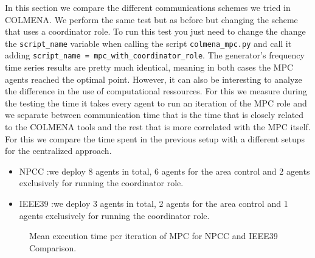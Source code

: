 \documentclass{article}
\begin{document}
In this section we compare the different communications schemes we tried in COLMENA. We perform the same test but as before but changing the scheme that uses a coordinator role. To run this test you just need to change the change the \texttt{script\_name} variable when calling the script \texttt{colmena\_mpc.py} and call it adding \texttt{script\_name = mpc\_with\_coordinator\_role}. The generator's frequency time series results are pretty much identical, meaning in both cases the MPC agents reached the optimal point. However, it can also be interesting to analyze the difference in the use of computational ressources. For this we measure during the testing the time it takes every agent to run an iteration of the MPC role and we separate between communication time that is the time that is closely related to the COLMENA tools and the rest that is more correlated with the MPC itself. For this we compare the time spent in the previous setup with a different setups for the centralized approach.  

\begin{itemize}
\item NPCC :we deploy 8 agents in total, 6 agents for the area control and 2 agents exclusively for running the coordinator role.
\item IEEE39 :we deploy 3 agents in total, 2 agents for the area control and 1 agents exclusively for running the coordinator role.
\end{itemize}

\begin{figure}[ht]
\centering
{}
\caption{Mean execution time per iteration of MPC for NPCC and IEEE39 Comparison.}
\label{fig:meantime}
\end{figure}
\end{document}
